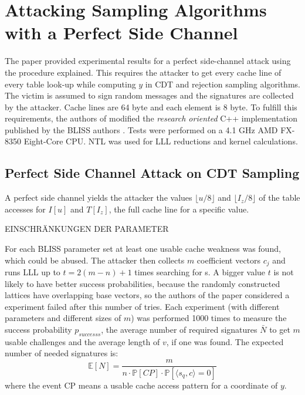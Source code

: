 \newpage
\section{Attacking Sampling Algorithms with a Perfect Side Channel}
The paper \cite{cryptoeprint:2016:300} provided experimental results for a perfect side-channel attack using the procedure explained. This requires the attacker to get every cache line of every table look-up while computing $y$ in CDT and rejection sampling algorithms. The victim is assumed to sign random messages and the signatures are collected by the attacker. Cache lines are 64 byte and each element is 8 byte. 
To fulfill this requirements, the authors of \cite{cryptoeprint:2016:300} modified the \textit{research oriented} C++ implementation published by the BLISS authors \cite{blisshp}. Tests were performed on a 4.1 GHz AMD FX-8350 Eight-Core CPU. NTL was used for LLL reductions and kernel calculations.
\subsection{Perfect Side Channel Attack on CDT Sampling}
A perfect side channel yields the attacker the values $\lfloor u/8 \rfloor$ and $\lfloor I_z/8 \rfloor$ of the table accesses for $I[u]$ and $T[I_z]$, the full cache line for a specific value. 

EINSCHRÄNKUNGEN DER PARAMETER



For each BLISS parameter set at least one usable cache weakness was found, which could be abused. 
The attacker then collects $m$ coefficient vectors $c_j$ and runs LLL up to $t = 2(m-n)+1$ times searching for s. A bigger value $t$ is not likely to have better success probabilities, because the randomly constructed lattices have overlapping base vectors, so the authors of the paper considered a experiment failed after this number of tries. Each experiment (with different parameters and different sizes of $m$) was performed 1000 times to measure the success probability $p_{successs}$, the average number of required signatures $\bar{N}$ to get $m$ usable challenges and the average length of $v$, if one was found.
The expected number of needed signatures is:
\begin{equation*}
\mathbb{E}[N] = \frac{m}{n \cdot \mathbb{P}[CP] \cdot \mathbb{P}[\langle s_q, c \rangle = 0]}
\end{equation*}
where the event CP means a usable cache access pattern for a coordinate of $y$.

